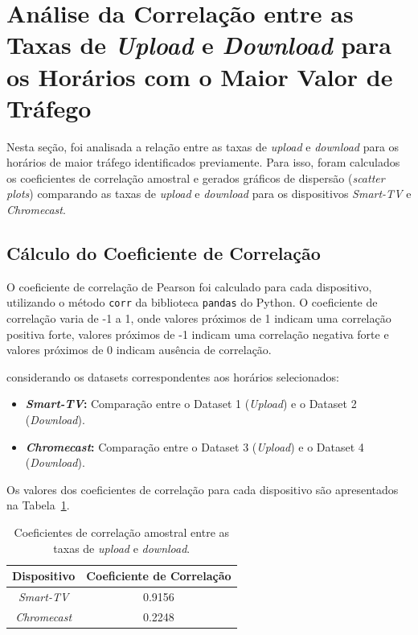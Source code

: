 \section{Análise da Correlação entre as Taxas de \textit{Upload} e \textit{Download} para os Horários com o Maior Valor de Tráfego}

Nesta seção, foi analisada a relação entre as taxas de \textit{upload} e \textit{download} para os horários de maior tráfego identificados previamente. Para isso, foram calculados os coeficientes de correlação amostral e gerados gráficos de dispersão (\textit{scatter plots}) comparando as taxas de \textit{upload} e \textit{download} para os dispositivos \textit{Smart-TV} e \textit{Chromecast}.

\subsection{Cálculo do Coeficiente de Correlação}

O coeficiente de correlação de Pearson foi calculado para cada dispositivo, utilizando o método \texttt{corr} da biblioteca \texttt{pandas} do Python. O coeficiente de correlação varia de -1 a 1, onde valores próximos de 1 indicam uma correlação positiva forte, valores próximos de -1 indicam uma correlação negativa forte e valores próximos de 0 indicam ausência de correlação.

considerando os datasets correspondentes aos horários selecionados:
\begin{itemize}
    \item \textbf{\textit{Smart-TV}:} Comparação entre o Dataset 1 (\textit{Upload}) e o Dataset 2 (\textit{Download}).
    \item \textbf{\textit{Chromecast}:} Comparação entre o Dataset 3 (\textit{Upload}) e o Dataset 4 (\textit{Download}).
\end{itemize}

Os valores dos coeficientes de correlação para cada dispositivo são apresentados na Tabela~\ref{tab:coeficientes_correlacao}.

\begin{table}[H]
    \centering
    \caption{Coeficientes de correlação amostral entre as taxas de \textit{upload} e \textit{download}.}
    \label{tab:coeficientes_correlacao}
    \begin{tabular}{|c|c|}
        \hline
        \textbf{Dispositivo} & \textbf{Coeficiente de Correlação} \\ \hline
        \textit{Smart-TV} & 0.9156 \\ \hline
        \textit{Chromecast} & 0.2248 \\ \hline
    \end{tabular}
\end{table}

